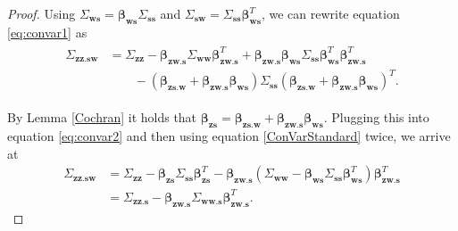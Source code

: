 \documentclass[11pt,a4paper]{article}
\newtheorem{Corollary}[Satz]{Corollary}
\theoremstyle{definition}
\theoremstyle{remark}
\begin{document}
\begin{proof}
Using $\Sigma_{\mathbf{ws}} = \boldsymbol{\beta}_{\mathbf{ws}} \Sigma_{\mathbf{ss}}$ and $\Sigma_{\mathbf{sw}} = \Sigma_{\mathbf{ss}} \boldsymbol{\beta}^T_{\mathbf{ws}}$, we can rewrite equation \eqref{eq:convar1} as
\begin{align}
\begin{split}
\Sigma_{\mathbf{zz}.\mathbf{sw}} &= 
\Sigma_{\mathbf{zz}} - \boldsymbol{\beta}_{\mathbf{zw}.\mathbf{s}} \Sigma_{\mathbf{ww}} \boldsymbol{\beta}^{T}_{\mathbf{zw}.\mathbf{s}} 
+ \boldsymbol{\beta}_{\mathbf{zw}.\mathbf{s}} \boldsymbol{\beta}_{\mathbf{ws}} \Sigma_{\mathbf{ss}} \boldsymbol{\beta}^T_{\mathbf{ws}} \boldsymbol{\beta}^T_{\mathbf{zw}.\mathbf{s}} \\
&\quad\quad - (\boldsymbol{\beta}_{\mathbf{zs}.\mathbf{w}} + \boldsymbol{\beta}_{\mathbf{zw}.\mathbf{s}} \boldsymbol{\beta}_{\mathbf{ws}}) \Sigma_{\mathbf{ss}}
(\boldsymbol{\beta}_{\mathbf{zs}.\mathbf{w}} + \boldsymbol{\beta}_{\mathbf{zw}.\mathbf{s}} \boldsymbol{\beta}_{\mathbf{ws}})^T. \label{eq:convar2}
\end{split}
\end{align}

By Lemma \ref{Cochran} it holds that $\boldsymbol{\beta}_{\mathbf{zs}} = \boldsymbol{\beta}_{\mathbf{zs}.\mathbf{w}} + \boldsymbol{\beta}_{\mathbf{zw}.\mathbf{s}} \boldsymbol{\beta}_{\mathbf{ws}}$. Plugging this into equation \eqref{eq:convar2} and then using equation \eqref{ConVarStandard} twice, we arrive at
\begin{align*}
\Sigma_{\mathbf{zz}.\mathbf{sw}} &= 
\Sigma_{\mathbf{zz}} - \boldsymbol{\beta}_{\mathbf{zs}} \Sigma_{\mathbf{ss}} \boldsymbol{\beta}^{T}_{\mathbf{zs}} 
- \boldsymbol{\beta}_{\mathbf{zw}.\mathbf{s}}(\Sigma_{\mathbf{ww}} - \boldsymbol{\beta}_{\mathbf{ws}} \Sigma_{\mathbf{ss}} \boldsymbol{\beta}^T_{\mathbf{ws}} )\boldsymbol{\beta}^{T}_{\mathbf{zw}.\mathbf{s}} \\
&= \Sigma_{\mathbf{zz}.\mathbf{s}} - \boldsymbol{\beta}_{\mathbf{zw}.\mathbf{s}} \Sigma_{\mathbf{ww}.\mathbf{s}} \boldsymbol{\beta}^T_{\mathbf{zw}.\mathbf{s}}.
\end{align*}
\end{proof}%



\end{document}
